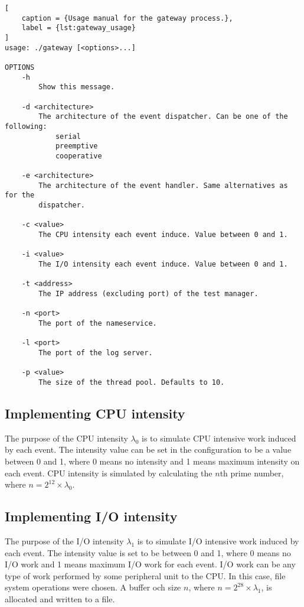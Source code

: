 \begin{lstlisting}[
    caption = {Usage manual for the gateway process.},
    label = {lst:gateway_usage}
]
usage: ./gateway [<options>...]

OPTIONS
    -h
        Show this message.

    -d <architecture>
        The architecture of the event dispatcher. Can be one of the following:
            serial
            preemptive
            cooperative

    -e <architecture>
        The architecture of the event handler. Same alternatives as for the
        dispatcher.

    -c <value>
        The CPU intensity each event induce. Value between 0 and 1.

    -i <value>
        The I/O intensity each event induce. Value between 0 and 1.

    -t <address>
        The IP address (excluding port) of the test manager.

    -n <port>
        The port of the nameservice.

    -l <port>
        The port of the log server.

    -p <value>
        The size of the thread pool. Defaults to 10.
\end{lstlisting}

\subsection{Implementing CPU intensity}

The purpose of the CPU intensity $\lambda_0$ is to simulate CPU intensive work
induced by each event. The intensity value can be set in the configuration to
be a value between 0 and 1, where 0 means no intensity and 1 means maximum
intensity on each event. CPU intensity is simulated by calculating the $n$th
prime number, where $n = 2^{12} \times \lambda_0$.

\subsection{Implementing I/O intensity}

The purpose of the I/O intensity $\lambda_1$ is to simulate I/O intensive work
induced by each event. The intensity value is set to be between 0 and 1, where
0 means no I/O work and 1 means maximum I/O work for each event. I/O work can
be any type of work performed by some peripheral unit to the CPU. In this case,
file system operations were chosen. A buffer och size $n$, where $n = 2^{28}
\times \lambda_1$, is allocated and written to a file.

